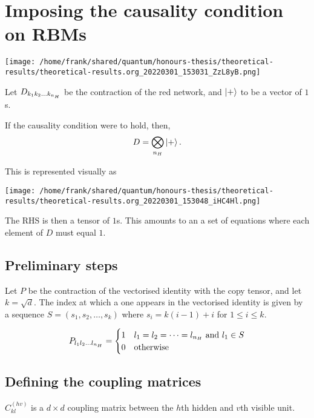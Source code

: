 \documentclass[11pt]{article}
\begin{document}
\section{Imposing the causality condition on RBMs}
\label{sec:orgc668679}

\begin{center}
\texttt{[image: /home/frank/shared/quantum/honours-thesis/theoretical-results/theoretical-results.org\_20220301\_153031\_ZzL8yB.png]}
\end{center}

Let \(D_{k_1k_2 \dots k_{n_H}}\) be the contraction of the red network, and \(\ket{+}\) to be a vector of \(1\)s.


If the causality condition were to hold, then,
\begin{equation} \label{eqn}
    D = \underset{n_H}{\bigotimes} \ket{+}.
\end{equation}

This is represented visually as
\begin{center}
\texttt{[image: /home/frank/shared/quantum/honours-thesis/theoretical-results/theoretical-results.org\_20220301\_153048\_iHC4Hl.png]}
\end{center}

The RHS is then a tensor of \(1\)s. This amounts to an a set of equations where each element of \(D\) must equal \(1\).

\subsection{Preliminary steps}
\label{sec:org49b2dc3}
Let \(P\) be the contraction of the vectorised identity with the copy tensor, and let \(k = \sqrt{d}\).
The index at which a one appears in the vectorised identity is given by a sequence \(S = (s_1, s_2, \dots, s_k )\) where \(s_i = k(i - 1) + i\) for \(1 \leq i \leq k\).


\[
P_{l_1l_2 \dots l_{n_H}} = \begin{cases}
  1 & l_1 = l_2 = \dots = l_{n_H} \text{ and } l_1 \in S \\
  0 & \text{otherwise}
\end{cases}
\]

\subsection{Defining the coupling matrices}
\label{sec:orgd833376}

\(C^{(hv)}_{kl}\) is a \(d \times d\) coupling matrix between the \(h\)th hidden and \(v\)th visible unit.
\end{document}
